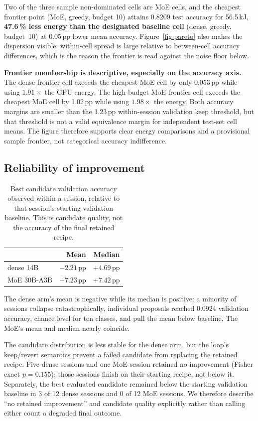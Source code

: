Two of the three sample non-dominated cells are MoE cells, and the cheapest frontier
point (MoE, greedy, budget 10) attains 0.8209 test accuracy for 56.5\,kJ,
\textbf{47.6\,\% less energy than the designated baseline cell} (dense, greedy,
budget~10) at 0.05\,pp lower mean accuracy. Figure~\ref{fig:pareto} also makes the dispersion visible: within-cell spread is
large relative to between-cell accuracy differences, which is the reason the
frontier is read against the noise floor below.

\textbf{Frontier membership is descriptive, especially on the accuracy axis.}
The dense frontier cell exceeds the cheapest MoE cell by only 0.053\,pp while
using $1.91\times$ the GPU energy. The high-budget MoE frontier cell exceeds the
cheapest MoE cell by 1.02\,pp while using $1.98\times$ the energy. Both accuracy
margins are smaller than the 1.23\,pp within-session validation keep threshold,
but that threshold is not a valid equivalence margin for independent test-set
cell means. The figure therefore supports clear energy comparisons and a
provisional sample frontier, not categorical accuracy indifference.

\subsection{Reliability of improvement}

\begin{table}[htbp]
\centering
\caption{Best candidate validation accuracy observed within a session, relative
to that session's starting validation baseline. This is candidate quality, not
the accuracy of the final retained recipe.}
\label{tab:reliability}
\begin{tabular}{lrr}
\toprule
& Mean & Median \\
\midrule
dense 14B    & $-2.21$\,pp & $+4.69$\,pp \\
MoE 30B-A3B  & $+7.23$\,pp & $+7.42$\,pp \\
\bottomrule
\end{tabular}
\end{table}

The dense arm's mean is negative while its median is positive: a minority of
sessions collapse catastrophically, individual proposals reached $0.0924$
validation accuracy, chance level for ten classes, and pull the mean below
baseline. The MoE's mean and median nearly coincide.

The candidate distribution is less stable for the dense arm, but the loop's
keep/revert semantics prevent a failed candidate from replacing the retained
recipe. Five dense sessions and one MoE session retained no improvement (Fisher
exact $p=0.155$); those sessions finish on their starting recipe, not below it.
Separately, the best evaluated candidate remained below the starting validation
baseline in 3 of 12 dense sessions and 0 of 12 MoE sessions. We therefore describe
``no retained improvement'' and candidate quality explicitly rather than calling
either count a degraded final outcome.

